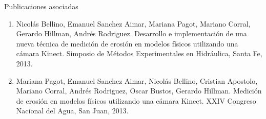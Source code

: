 
\begin{seccion}{Publicaciones asociadas}
  \begin{enumerate}

  \item Nicolás Bellino, Emanuel Sanchez Aimar, Mariana Pagot, Mariano Corral, Gerardo Hillman, Andrés Rodriguez. Desarrollo e implementación de una nueva técnica de medición de erosión en modelos físicos utilizando una cámara Kinect. Simposio de Métodos Experimentales en Hidráulica, Santa Fe, 2013.

  \item Mariana Pagot, Emanuel Sanchez Aimar, Nicolás Bellino, Cristian Apostolo, Mariano Corral, Andrés Rodriguez, Oscar Bustos, Gerardo Hillman. Medición de erosión en modelos físicos utilizando una cámara Kinect. XXIV Congreso Nacional del Agua, San Juan, 2013.

  \end{enumerate}
\end{seccion}

